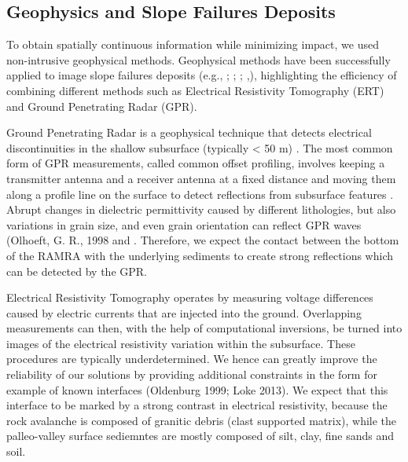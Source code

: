 \documentclass[5p]{elsarticle}
\begin{document}
\bigskip

                 
                 
\subsection{Geophysics and Slope Failures Deposits}

To obtain spatially continuous information while minimizing impact, we used non-intrusive geophysical methods. Geophysical methods have been successfully applied to image slope failures deposits (e.g., \cite{sass2006determination}; \cite{otto2006comparing}; \cite{socco2010geophysical}; \cite{brody2015near},\cite{liu2018near}), highlighting the efficiency of combining different methods such as Electrical Resistivity Tomography (ERT) and Ground Penetrating Radar (GPR). 
                 
Ground Penetrating Radar is a geophysical technique that detects electrical discontinuities in the shallow subsurface (typically < 50 m) \citep{neal2004ground}. The most common form of GPR measurements, called common offset profiling, involves keeping a transmitter antenna and a receiver antenna at a fixed distance and moving them along a profile line on the surface to detect reflections from subsurface features \citep{jol2008ground}. Abrupt changes in dielectric permittivity caused by different lithologies, but also variations in grain size, and even grain orientation can reflect GPR waves (Olhoeft, G. R., 1998 and \citep{neal2004ground}. Therefore, we expect the contact between the bottom of the RAMRA with the underlying sediments to create strong reflections which can be detected by the GPR.          

Electrical Resistivity Tomography operates by measuring voltage differences caused by electric currents that are injected into the ground. Overlapping measurements can then, with the help of computational inversions, be turned into images of the electrical resistivity variation within the subsurface. These procedures are typically underdetermined. We hence can greatly improve the reliability of our solutions by providing additional constraints in the form for example of known interfaces (Oldenburg 1999; Loke 2013). We expect that this interface to be marked by a strong contrast in electrical resistivity, because the rock avalanche is composed of granitic debris (clast supported matrix), while the palleo-valley surface sediemntes are mostly composed of silt, clay, fine sands and soil. 
\end{document}
